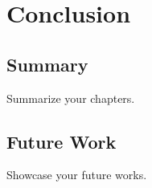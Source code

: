 
\chapter{Conclusion}
\label{chp:conclusion}

\section{Summary}

Summarize your chapters.

\section{Future Work}

Showcase your future works.